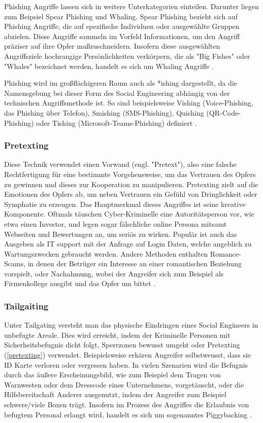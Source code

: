 Phishing Angriffe lassen sich in weitere Unterkategorien einteilen. Darunter liegen zum Beipsiel Spear Phishing und Whaling.
Spear Phishing bezieht sich auf Phishing Angriffe, die auf spezifische Individuen oder ausgewählte Gruppen abzielen.
Diese Angriffe sammeln im Vorfeld Informationen, um den Angriff präziser auf ihre Opfer maßzuschneidern. Insofern diese ausgewählten Angriffsziele
hochrangige Persönlichkeiten verkörpern, die als "Big Fishes" oder "Whales" bezeichnet werden, handelt es sich um Whaling Angriffe .

Phishing wird im großflächigeren Raum auch als *ishing dargestellt, da die Namensgebung bei dieser Form des Social Engineering abhängig von der
technischen Angriffsmethode ist. So sind beispielsweise Vishing (Voice-Phishing, das Phishing über Telefon), Smishing (SMS-Phishing),
Quishing (QR-Code-Phishing) oder Tishing (Microsoft-Teams-Phishing) definiert .

\subsubsection{Pretexting}
\label{pretexting}
Diese Technik verwendet einen Vorwand (engl. "Pretext"), also eine falsche Rechtfertigung für eine bestimmte Vorgehensweise, um das Vertrauen des
Opfers zu gewinnen und dieses zur Kooperation zu manipulieren. Pretexting zielt auf die Emotionen des Opfers ab, um neben Vertrauen ein Gefühl von
Dringlichkeit oder Symphatie zu erzeugen. Das Hauptmerkmal dieses Angriffes ist seine kreative Komponente. Oftmals täuschen Cyber-Kriminelle
eine Autoritätsperson vor, wie etwa einen Investor, und legen sogar fälschliche online Persona mitsamt Webseiten und Bewertungen an, um seriös zu wirken.
Populär ist auch das Ausgeben als IT support mit der Anfrage auf Login Daten, welche angeblich zu Wartungszwecken gebraucht werden.
Andere Methoden enthalten Romance-Scams, in denen der Betrüger ein Interesse an einer romantischen Beziehung vorspielt, oder Nachahmung, wobei der
Angreifer sich zum Beispiel als Firmenkollege ausgibt und das Opfer um  bittet .

\subsubsection{Tailgaiting}
Unter Tailgating versteht man das physische Eindringen eines Social Engineers in unbefugte Areale.
Dies wird erreicht, indem der Kriminelle Personen mit Sicherheitsbefugnis dicht folgt, Sperrzonen bewusst umgeht oder Pretexting (\autoref{pretexting})
verwendet. Beispielsweise erkären Angreifer selbstweusst, dass sie ID Karte verloren oder vergessen haben. In vielen Szenarien wird die
Befugnis durch das äußere Erscheinungsbild, wie zum Beispiel dem Tragen von Warnwesten oder dem Dresscode eines Unternehmens, vorgetäuscht, oder die Hilfsbereitschaft Anderer ausgenutzt,
indem der Angreifer zum Beispiel schwere/viele Boxen trägt. Insofern im Prozess des Angriffes die Erlaubnis von befugtem Personal erlangt wird, handelt es sich um sogenanntes Piggybacking .

